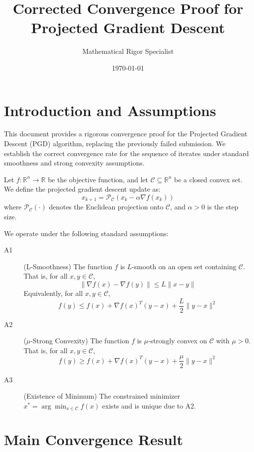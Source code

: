\documentclass[11pt]{article}
\begin{document}
\title{Corrected Convergence Proof for Projected Gradient Descent}
\author{Mathematical Rigor Specialist}
\date{\today}
\maketitle

\section{Introduction and Assumptions}

This document provides a rigorous convergence proof for the Projected Gradient Descent (PGD) algorithm, replacing the previously failed submission. We establish the correct convergence rate for the sequence of iterates under standard smoothness and strong convexity assumptions.

Let $f: \mathbb{R}^n \to \mathbb{R}$ be the objective function, and let $\mathcal{C} \subseteq \mathbb{R}^n$ be a closed convex set. We define the projected gradient descent update as:
\begin{equation}
x_{k+1} = \mathcal{P}_{\mathcal{C}}(x_k - \alpha \nabla f(x_k))
\end{equation}
where $\mathcal{P}_{\mathcal{C}}(\cdot)$ denotes the Euclidean projection onto $\mathcal{C}$, and $\alpha > 0$ is the step size.

We operate under the following standard assumptions:
\begin{description}
\item[A1] (L-Smoothness) The function $f$ is $L$-smooth on an open set containing $\mathcal{C}$. That is, for all $x, y \in \mathcal{C}$,
\[ \|\nabla f(x) - \nabla f(y)\| \leq L \|x - y\| \]
Equivalently, for all $x, y \in \mathcal{C}$,
\[ f(y) \leq f(x) + \nabla f(x)^T (y - x) + \frac{L}{2} \|y - x\|^2 \]

\item[A2] ($\mu$-Strong Convexity) The function $f$ is $\mu$-strongly convex on $\mathcal{C}$ with $\mu > 0$. That is, for all $x, y \in \mathcal{C}$,
\[ f(y) \geq f(x) + \nabla f(x)^T (y - x) + \frac{\mu}{2} \|y - x\|^2 \]

\item[A3] (Existence of Minimum) The constrained minimizer $x^* = \arg\min_{x \in \mathcal{C}} f(x)$ exists and is unique due to A2.
\end{description}

\section{Main Convergence Result}
\end{document}
